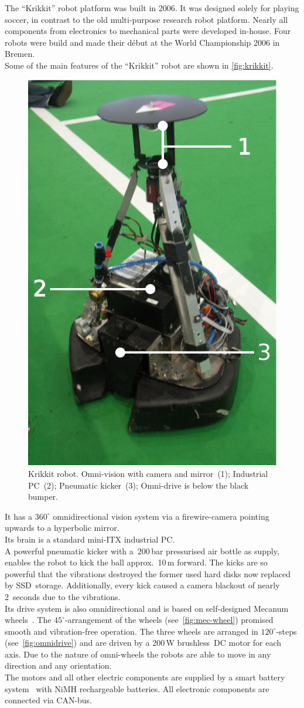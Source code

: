 \documentclass[12pt,a4paper]{article}
\begin{document}
The ``Krikkit'' robot platform was built in 2006. %
It was designed solely for playing soccer, in contrast to the old multi-purpose research robot platform.
Nearly all components from electronics to mechanical parts were developed in-house.
Four robots were build and made their d\'ebut at the World Championship 2006 in Bremen.\\
Some of the main features of the ``Krikkit'' robot are shown in \autoref{fig:krikkit}.

\begin{figure}[htbp]
\begin{center}
\includegraphics[width=0.5\columnwidth]{figures/krikkit.pdf}
\caption{\label{fig:krikkit}
Krikkit robot. Omni-vision with camera and mirror~(1); Industrial PC~(2); Pneumatic kicker~(3); Omni-drive is below the black bumper.
}
\end{center}
\end{figure}

It has a $360^\circ$ omnidirectional vision system via a firewire-camera pointing upwards to a hyperbolic mirror.\\
Its brain is a standard mini-ITX industrial PC.\\
A powerful pneumatic kicker with a~200\,bar pressurised air bottle as supply, enables the robot to kick the ball approx.\ 10\,m forward.
The kicks are so powerful that the vibrations destroyed the former used hard disks now replaced by SSD~storage.
Additionally, every kick caused a camera blackout of nearly 2~seconds due to the vibrations.\\
Its drive system is also omnidirectional and is based on self-designed Mecanum wheels~\cite{mecanum2007}. 
The $45^\circ$\mbox{-}arrangement of the wheels (see~\autoref{fig:mec-wheel}) promised smooth and vibration-free operation.
The three wheels are arranged in $120^\circ$\mbox{-}steps (see~\autoref{fig:omnidrive}) and are driven by a 200\,W brushless~DC motor for each axis.
Due to the nature of omni-wheels the robots are able to move in any direction and any orientation.\\
The motors and all other electric components are supplied by a smart battery system~\cite{krammer06} with NiMH rechargeable batteries.
All electronic components are connected via CAN-bus.
\end{document}
